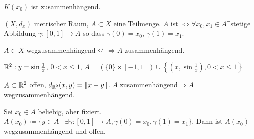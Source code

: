 \begin{bemerkung*}
$ K(x_0) $ ist zusammenh\"angend.
\end{bemerkung*}
\begin{definition}
$ (X,d_x) $ metrischer Raum, $ A\subset X $ eine Teilmenge. $ A $ ist $ \Leftrightarrow\forall x_0,x_1\in A \exists$stetige Abbildung $ \gamma\colon[0,1]\rightarrow A $ so dass $ \gamma(0)=x_0 $, $ \gamma(1)=x_1 $.
\end{definition}
\begin{bemerkung*}
$ A\subset X $ wegzusammenh\"angend$ \nLeftarrow\Rightarrow A$ zusammenh\"angend.
\begin{beispiel*}
$ \mathbb{R}^2: y=\sin\frac{1}{x} $, $ 0<x\leq 1 $, $ A=(\lbrace 0\rbrace\times[-1,1])\cup\left\lbrace\left(x,\sin\frac{1}{x}\right),0<x\leq 1\right\rbrace $
\end{beispiel*}
\end{bemerkung*}
\begin{proposition}
$ A\subset\mathbb{R}^2 $ offen, $ d_{\mathbb{R}^2} (x,y)=\left\|x-y\right\|$. $ A $ zusammenh\"angend$ \Rightarrow A $wegzusammenh\"angend.
\end{proposition}
\begin{beweis}
Sei $ x_0\in A $ beliebig, aber fixiert. $ A(x_0)\coloneqq\lbrace y\in A\mid\exists\gamma\colon[0,1]\rightarrow A, \gamma(0)=x_0,\gamma(1)=x_1\rbrace $. Dann ist $ A(x_0) $ wegzusammenh\"angend und offen.
\end{beweis}